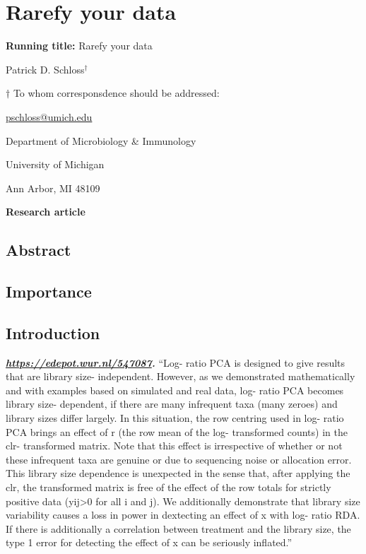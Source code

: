\documentclass[
]{article}
\author{}
\date{\vspace{-2.5em}}
\begin{document}
\hypertarget{rarefy-your-data}{%
\section{Rarefy your data}\label{rarefy-your-data}}

\vspace{20mm}

\textbf{Running title:} Rarefy your data

\vspace{20mm}

Patrick D. Schloss\({^\dagger}\)

\vspace{40mm}

\({\dagger}\) To whom corresponsdence should be addressed:

\href{mailto:pschloss@umich.edu}{pschloss@umich.edu}

Department of Microbiology \& Immunology

University of Michigan

Ann Arbor, MI 48109

\vspace{20mm}

\textbf{Research article}

\newpage

\hypertarget{abstract}{%
\subsection{Abstract}\label{abstract}}

\hypertarget{importance}{%
\subsection{Importance}\label{importance}}

\newpage

\hypertarget{introduction}{%
\subsection{Introduction}\label{introduction}}

\textbf{\emph{\url{https://edepot.wur.nl/547087}.}} ``Log- ratio PCA is
designed to give results that are library size- independent. However, as
we demonstrated mathematically and with examples based on simulated and
real data, log- ratio PCA becomes library size- dependent, if there are
many infrequent taxa (many zeroes) and library sizes differ largely. In
this situation, the row centring used in log- ratio PCA brings an effect
of r (the row mean of the log- transformed counts) in the clr-
transformed matrix. Note that this effect is irrespective of whether or
not these infrequent taxa are genuine or due to sequencing noise or
allocation error. This library size dependence is unexpected in the
sense that, after applying the clr, the transformed matrix is free of
the effect of the row totals for strictly positive data
(yij\textgreater0 for all i and j). We additionally demonstrate that
library size variability causes a loss in power in dextecting an effect
of x with log- ratio RDA. If there is additionally a correlation between
treatment and the library size, the type 1 error for detecting the
effect of x can be seriously inflated.''
\end{document}
